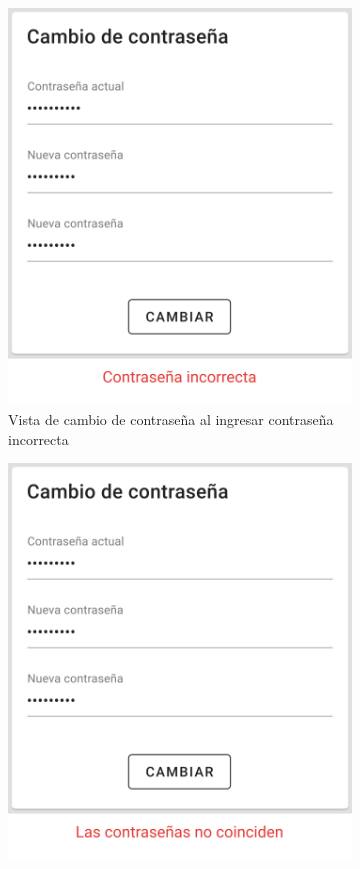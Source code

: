 \begin{itemize}
\begin{figure}[H]
\begin{subfigure}[b]{0.45\textwidth}
        \includegraphics[width=\textwidth]{images/app/change-psw-error1.png}
        \caption{Vista de cambio de contraseña al ingresar contraseña incorrecta}
        \label{fig:app-change-psw_error-1}
    \end{subfigure}
    \hfill
    \begin{subfigure}[b]{0.45\textwidth}
        \centering
        \includegraphics[width=\textwidth]{images/app/change-psw-error2.png}

\end{subfigure}
\end{figure}
\end{itemize}
